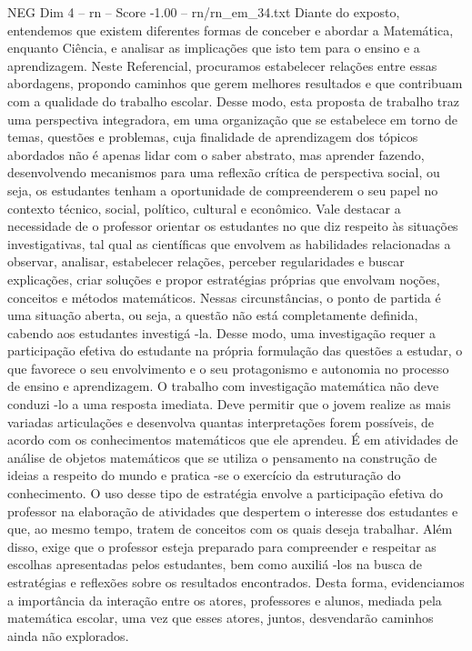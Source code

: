 \begin{textsample}{NEG Dim 4 – rn – Score -1.00 – rn/rn\_em\_34.txt}
Diante do exposto, entendemos que existem diferentes formas de conceber e abordar a Matemática, enquanto Ciência, e analisar as implicações que isto tem para o ensino e a aprendizagem.
Neste Referencial, procuramos estabelecer relações entre essas abordagens, propondo caminhos que gerem melhores resultados e que contribuam com a qualidade do trabalho escolar.
Desse modo, esta proposta de trabalho traz uma perspectiva integradora, em uma organização que se estabelece em torno de temas, questões e problemas, cuja finalidade de aprendizagem dos tópicos abordados não é apenas lidar com o saber abstrato, mas aprender fazendo, desenvolvendo mecanismos para uma reflexão crítica de perspectiva social, ou seja, os estudantes tenham a oportunidade de compreenderem o seu papel no contexto técnico, social, político, cultural e econômico.
Vale destacar a necessidade de o professor orientar os estudantes no que diz respeito às situações investigativas, tal qual as científicas que envolvem as habilidades relacionadas a observar, analisar, estabelecer relações, perceber regularidades e buscar explicações, criar soluções e propor estratégias próprias que envolvam noções, conceitos e métodos matemáticos.
Nessas circunstâncias, o ponto de partida é uma situação aberta, ou seja, a questão não está completamente definida, cabendo aos estudantes investigá -la.
Desse modo, uma investigação requer a participação efetiva do estudante na própria formulação das questões a estudar, o que favorece o seu envolvimento e o seu protagonismo e autonomia no processo de ensino e aprendizagem.
O trabalho com investigação matemática não deve conduzi -lo a uma resposta imediata.
Deve permitir que o jovem realize as mais variadas articulações e desenvolva quantas interpretações forem possíveis, de acordo com os conhecimentos matemáticos que ele aprendeu.
É em atividades de análise de objetos matemáticos que se utiliza o pensamento na construção de ideias a respeito do mundo e pratica -se o exercício da estruturação do conhecimento.
O uso desse tipo de estratégia envolve a participação efetiva do professor na elaboração de atividades que despertem o interesse dos estudantes e que, ao mesmo tempo, tratem de conceitos com os quais deseja trabalhar.
Além disso, exige que o professor esteja preparado para compreender e respeitar as escolhas apresentadas pelos estudantes, bem como auxiliá -los na busca de estratégias e reflexões sobre os resultados encontrados.
Desta forma, evidenciamos a importância da interação entre os atores, professores e alunos, mediada pela matemática escolar, uma vez que esses atores, juntos, desvendarão caminhos ainda não explorados.

\end{textsample}
